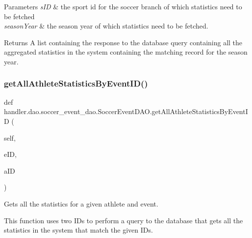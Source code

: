 \begin{DoxyParams}{Parameters}
{\em s\+ID} & the sport id for the soccer branch of which statistics need to be fetched \\
\hline
{\em season\+Year} & the season year of which statistics need to be fetched.\\
\hline
\end{DoxyParams}
\begin{DoxyReturn}{Returns}
A list containing the response to the database query containing all the aggregated statistics in the system containing the matching record for the season year. 
\end{DoxyReturn}
\mbox{\label{classhandler_1_1dao_1_1soccer__event__dao_1_1_soccer_event_d_a_o_adbd71f58b07d602ada5bf42995d1c364}} 
\subsubsection{\texorpdfstring{get\+All\+Athlete\+Statistics\+By\+Event\+I\+D()}{getAllAthleteStatisticsByEventID()}}
{\footnotesize\ttfamily def handler.\+dao.\+soccer\+\_\+event\+\_\+dao.\+Soccer\+Event\+D\+A\+O.\+get\+All\+Athlete\+Statistics\+By\+Event\+ID (\begin{DoxyParamCaption}\item[{}]{self,  }\item[{}]{e\+ID,  }\item[{}]{a\+ID }\end{DoxyParamCaption})}



Gets all the statistics for a given athlete and event. 

This function uses two I\+Ds to perform a query to the database that gets all the statistics in the system that match the given I\+Ds.


